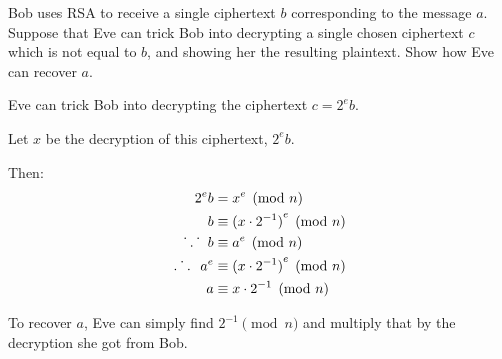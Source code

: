 \begin{problem}
Bob uses RSA to receive a single ciphertext $b$ corresponding to the
message $a$.  Suppose that Eve can trick Bob into decrypting a single
chosen ciphertext $c$ which is not equal to $b$, and showing her the
resulting plaintext.  Show how Eve can recover $a$.
\end{problem}

\begin{Answer}
  Eve can trick Bob into decrypting the ciphertext $c = 2^{e}b$.

  \noindent
  Let $x$ be the decryption of this ciphertext, $2^{e}b$.

  Then:
  \begin{align*}
    2^{e}b &= x^{e} \pmod{n} \\
    b &\equiv {(x \cdot 2^{-1})}^{e} \pmod n \\
    \dot{}\hspace{.045in}.\hspace{.045in} \dot{}\hspace{.095in} b &\equiv a^{e} \pmod{n} \\
    \dot{.\hspace{.095in}.}\hspace{.095in} a^{e} &\equiv {(x \cdot 2^{-1})}^{e} \pmod{n} \\
    a &\equiv x \cdot 2^{-1} \pmod{n} \\ 
  \end{align*}

  \noindent
  To recover $a$, Eve can simply find $2^{-1} \pmod{n}$
  and multiply that by the decryption she got from Bob. 

\end{Answer}
